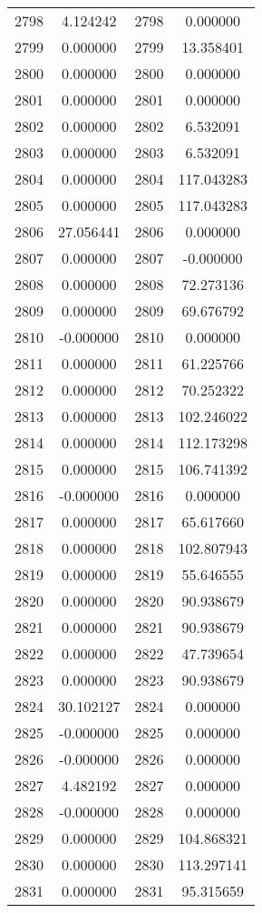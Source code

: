 \documentclass[12pt]{article}
\begin{document}
\begin{longtable}{@{}cccc@{}}
2798 & 4.124242 & 2798 & 0.000000 \\
2799 & 0.000000 & 2799 & 13.358401 \\
2800 & 0.000000 & 2800 & 0.000000 \\
2801 & 0.000000 & 2801 & 0.000000 \\
2802 & 0.000000 & 2802 & 6.532091 \\
2803 & 0.000000 & 2803 & 6.532091 \\
2804 & 0.000000 & 2804 & 117.043283 \\
2805 & 0.000000 & 2805 & 117.043283 \\
2806 & 27.056441 & 2806 & 0.000000 \\
2807 & 0.000000 & 2807 & -0.000000 \\
2808 & 0.000000 & 2808 & 72.273136 \\
2809 & 0.000000 & 2809 & 69.676792 \\
2810 & -0.000000 & 2810 & 0.000000 \\
2811 & 0.000000 & 2811 & 61.225766 \\
2812 & 0.000000 & 2812 & 70.252322 \\
2813 & 0.000000 & 2813 & 102.246022 \\
2814 & 0.000000 & 2814 & 112.173298 \\
2815 & 0.000000 & 2815 & 106.741392 \\
2816 & -0.000000 & 2816 & 0.000000 \\
2817 & 0.000000 & 2817 & 65.617660 \\
2818 & 0.000000 & 2818 & 102.807943 \\
2819 & 0.000000 & 2819 & 55.646555 \\
2820 & 0.000000 & 2820 & 90.938679 \\
2821 & 0.000000 & 2821 & 90.938679 \\
2822 & 0.000000 & 2822 & 47.739654 \\
2823 & 0.000000 & 2823 & 90.938679 \\
2824 & 30.102127 & 2824 & 0.000000 \\
2825 & -0.000000 & 2825 & 0.000000 \\
2826 & -0.000000 & 2826 & 0.000000 \\
2827 & 4.482192 & 2827 & 0.000000 \\
2828 & -0.000000 & 2828 & 0.000000 \\
2829 & 0.000000 & 2829 & 104.868321 \\
2830 & 0.000000 & 2830 & 113.297141 \\
2831 & 0.000000 & 2831 & 95.315659 \\

\end{longtable}
\end{document}
